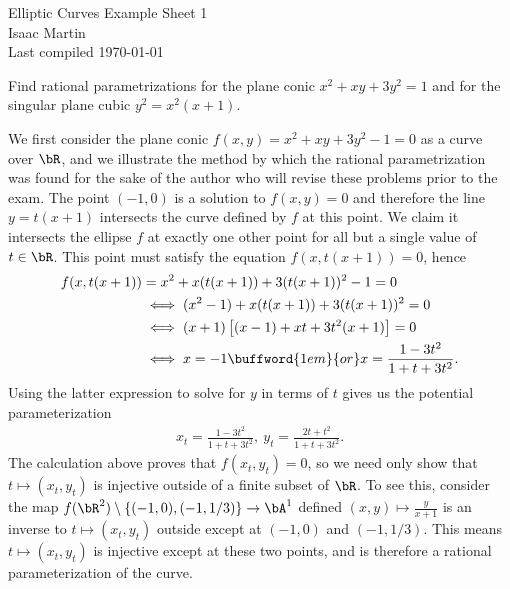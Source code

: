 


\pagestyle{empty}
	\LARGE
\begin{center}
	Elliptic Curves Example Sheet 1\\
	\Large
	Isaac Martin \\
    Last compiled \today
\end{center}
\normalsize
\vspace{-2mm}
\hru

\begin{homework}[e]
	 Find rational parametrizations for the plane conic $x^{2} + xy + 3y^2 = 1$ and for the singular plane cubic $y^2 = x^2(x+1)$.
	\begin{prf}
		We first consider the plane conic $f(x,y) = x^2 + xy + 3y^2 - 1 = 0$ as a curve over $\bR$, and we illustrate the method by which the rational parametrization was found for the sake of the author who will revise these problems prior to the exam. The point $(-1,0)$ is a solution to $f(x,y) = 0$ and therefore the line $y = t(x+1)$ intersects the curve defined by $f$ at this point. We claim it intersects the ellipse $f$ at exactly one other point for all but a single value of $t \in \bR$. This point must satisfy the equation $f(x,t(x+1)) = 0$, hence
		\begin{align*}
			f(x,t(x+1)) &= x^2 + x(t(x+1)) + 3(t(x+1))^2 - 1 = 0 \\
			&\iff (x^2-1) + x(t(x+1)) + 3(t(x+1))^2 = 0 \\
			&\iff (x + 1)\left[(x-1)+xt+3t^2(x+1)\right] = 0 \\
			&\iff x = -1 \buffword{1em}{or} x = \frac{1 - 3t^2}{1 + t + 3t^2}.
		\end{align*}
		Using the latter expression to solve for $y$ in terms of $t$ gives us the potential parameterization
		\begin{align*}
			x_t = \frac{1 - 3t^2}{1 + t + 3t^2}, ~ y_t = \frac{2t + t^2}{1 + t + 3t^2}.
		\end{align*}
		The calculation above proves that $f(x_t, y_t) = 0$, so we need only show that $t \mapsto (x_t,y_t)$ is injective outside of a finite subset of $\bR$. To see this, consider the map $f(\bR^2)\setminus\{(-1,0),(-1,1/3)\} \to \bA^1$ defined $(x,y) \mapsto \frac{y}{x+1}$ is an inverse to $t \mapsto (x_t,y_t)$ outside except at $(-1,0)$ and  $(-1,1/3)$. This means $t \mapsto (x_t,y_t)$ is injective except at these two points, and is therefore a rational parameterization of the curve.

		\bigskip


\end{prf}
\end{homework}
